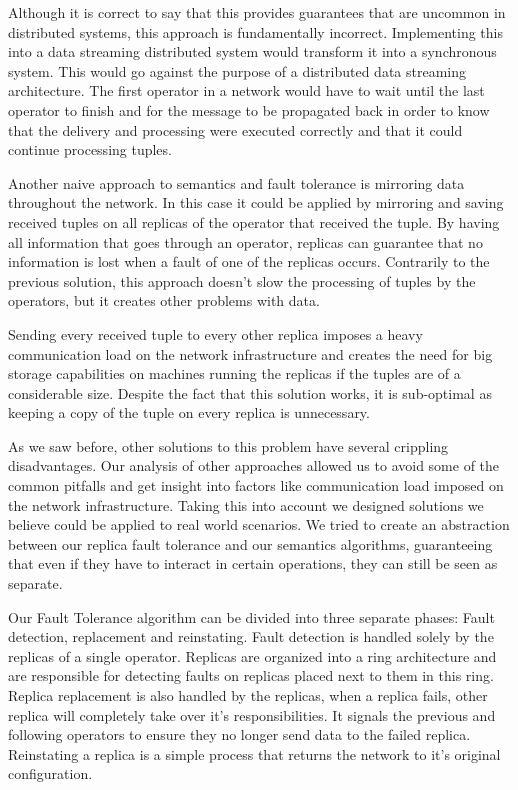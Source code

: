 \documentclass[times, 10pt,twocolumn]{article}
\begin{document}
	Although it is correct to say that this provides guarantees that are uncommon
in distributed systems, this approach is fundamentally incorrect. Implementing
this into a data streaming distributed system would transform it into a 
synchronous system. This would go against the purpose of a distributed
data streaming architecture. The first operator in a network would have to
wait until the last operator to finish and for the message to be propagated back in order to know that the delivery and processing 
were executed correctly and that it could continue processing tuples. 


	 Another naive approach to semantics and fault tolerance is mirroring data  
throughout the network. In this case it could be applied by mirroring and saving 
received tuples on all replicas of the operator that received the tuple. By having all information that goes through an
operator, replicas can guarantee that no information is lost when a fault of one of the replicas occurs.
Contrarily to the previous solution, this approach doesn't slow the processing 
of tuples by the operators, but it creates other problems with data. 

	Sending every received tuple to every other replica imposes a heavy communication
load on the network infrastructure and creates the need for big storage 
capabilities on machines running the replicas if the tuples are of a considerable size. Despite the fact that this solution
works, it is sub-optimal as keeping a copy of the tuple on every replica is unnecessary.
	

	As we saw before, other solutions to this problem have several crippling 
disadvantages. Our analysis of other approaches allowed us to avoid some of the 
common pitfalls and get insight into factors like communication load imposed on 
the network infrastructure. Taking this into account we designed solutions we believe 
could be applied to real world scenarios. We tried to create an abstraction between 
our replica fault tolerance and our semantics algorithms, guaranteeing that even if they have to interact in certain operations, they can still be seen as separate.

	Our Fault Tolerance algorithm can be divided into three separate phases: Fault
detection, replacement and reinstating. Fault detection is handled solely by 
the replicas of a single operator. Replicas are organized into a ring architecture
and are responsible for detecting faults on replicas placed next to them in this
ring. Replica replacement is also handled by the replicas, when a replica fails, 
other replica will completely take over it's responsibilities. It signals the previous and following 
operators to ensure they no longer send data to the failed replica. 
Reinstating a replica is a simple process that returns the network to it's original 
configuration.
\end{document}
